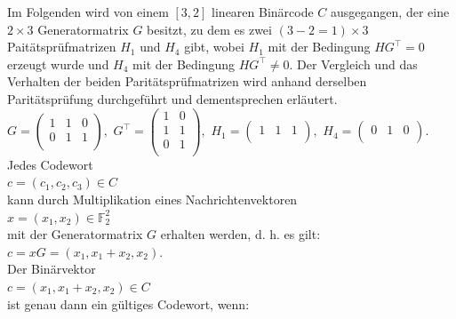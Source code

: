     
\begin{Beispiel}
    Im Folgenden wird von einem
    $[3,2]$ linearen Binärcode \(C\) ausgegangen, der eine $2 \times 3$ Generatormatrix $G$ besitzt, zu dem es zwei $(3-2=1) \times 3$ Paitätsprüfmatrizen $H_1$ und $H_4$ gibt, wobei $H_1$ mit der Bedingung $HG^\intercal = 0$ erzeugt wurde und $H_4$ mit der Bedingung $HG^\intercal \neq 0$. 
    Der Vergleich und das Verhalten der beiden Paritätsprüfmatrizen wird anhand derselben Paritätsprüfung durchgeführt und dementsprechen erläutert.\\
    
    $G=\left( \begin{array}{rrr}
        1 & 1 & 0 \\
        0 & 1 & 1 \\
     \end{array}\right),
    $
    $G^\intercal=\left( \begin{array}{rrr}
    1 & 0 \\
    1 & 1 \\
    0 & 1 \\
    \end{array}\right), 
    $
    $H_1=\left( \begin{array}{rrr}
    1 & 1 & 1 \\
    \end{array}\right),
    $
    $H_4=\left( \begin{array}{rrr}
    0 & 1 & 0 \\
    \end{array}\right).
    $\\
    
    Jedes Codewort\\
    $c = (c_{1},c_{2},c_{3}) \in C$\\
    
    kann durch Multiplikation eines Nachrichtenvektoren\\
    $x = (x_{1},x_{2}) \in \mathbb{F}_{2}^{2}$\\
    
    mit der Generatormatrix \(G\) erhalten werden, d. h. es gilt:\\
    $c=xG = (x_1,x_1+x_2,x_2).$\\
    
    Der Binärvektor\\
    $c = (x_1,x_1+x_2,x_2) \in C$\\
    
    ist genau dann ein gültiges Codewort, wenn:
    

\end{Beispiel}
